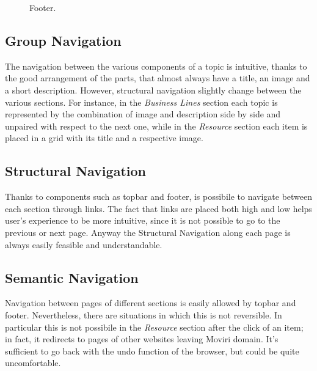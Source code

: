 \begin{figure}[H]
  \centering
  \caption{Footer.}
   \label{Footer}
\end{figure}

\subsection{Group Navigation}
The navigation between the various components of a topic is intuitive, thanks to the good arrangement of the parts, that almost always have a title, an image and a short description. However, structural navigation slightly change between the various sections. For instance, in the \textit{Business Lines} section each topic is represented by the combination of image and description side by side and unpaired with respect to the next one, while in the \textit{Resource} section each item is placed in a grid with its title and a respective image.
\subsection{Structural Navigation}
Thanks to components such as topbar and footer, is possibile to navigate between each section through links. The fact that links are placed both high and low helps user’s experience to be more intuitive, since it is not possible to go to the previous or next page. Anyway the Structural Navigation along each page is always easily feasible and understandable. 

\subsection{Semantic Navigation}
Navigation between pages of different sections is easily allowed by topbar and footer. Nevertheless, there are situations in which this is not reversible. In particular this is not possibile in the \textit{Resource} section after the click of an item; in fact, it redirects to pages of other websites leaving Moviri domain. It's sufficient to go back with the undo function of the browser, but could be quite uncomfortable.

